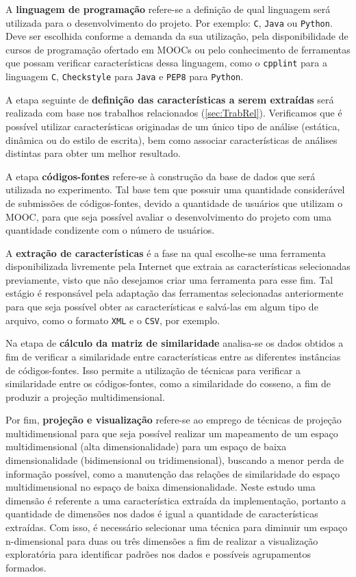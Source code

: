 	 	A \textbf{linguagem de programação} refere-se a definição de qual linguagem será
	 	utilizada para o desenvolvimento do projeto. Por exemplo: \texttt{C}, \texttt{Java}
	 	ou \texttt{Python}. Deve ser escolhida conforme a demanda da sua utilização, pela
	 	disponibilidade de cursos de programação ofertado em \acs{MOOC}s ou pelo conhecimento
	 	de ferramentas que possam verificar características dessa linguagem, como o
	 	\texttt{cpplint} para a linguagem \texttt{C}, \texttt{Checkstyle} para
	 	\texttt{Java} e \texttt{PEP8} para \texttt{Python}.
	 	
	 	A etapa seguinte de \textbf{definição das características a serem extraídas} será
	 	realizada com base nos trabalhos relacionados (\cref{sec:TrabRel}). Verificamos
	 	que é possível utilizar características originadas de um único tipo de análise
	 	(estática, dinâmica ou do estilo de escrita), bem como associar características
	 	de análises distintas para obter um melhor resultado.
	 	
	 	A etapa \textbf{códigos-fontes} refere-se à construção da base de dados que será
	 	utilizada no experimento. Tal base tem que possuir uma quantidade considerável de
	 	submissões de códigos-fontes, devido a quantidade de usuários que utilizam o \acs{MOOC},
	 	para que seja possível avaliar o desenvolvimento do projeto com uma quantidade
	 	condizente com o número de usuários.
	 	
	 	A \textbf{extração de características} é a fase na qual escolhe-se uma ferramenta
	 	disponibilizada livremente pela Internet que extraia as características selecionadas
	 	previamente, visto que não desejamos criar uma ferramenta para esse fim. Tal estágio
	 	é responsável pela adaptação das ferramentas selecionadas anteriormente para que seja
	 	possível obter as características e salvá-las em algum tipo de arquivo, como o
	 	formato \texttt{XML} e o \texttt{CSV}, por exemplo.
	 	
	 	Na etapa de \textbf{cálculo da matriz de similaridade} analisa-se os dados obtidos a
	 	fim de verificar a similaridade entre características entre as diferentes instâncias
	 	de códigos-fontes. Isso permite a utilização de técnicas para verificar a similaridade
	 	entre os códigos-fontes, como a similaridade do cosseno, a fim de produzir a projeção
	 	multidimensional.
	 	
	 	Por fim, \textbf{projeção e visualização} refere-se ao emprego de técnicas de
	 	projeção multidimensional para que seja possível realizar um mapeamento de um
	 	espaço multidimensional (alta dimensionalidade) para um espaço de baixa
	 	dimensionalidade (bidimensional ou tridimensional), buscando a menor perda de
	 	informação possível, como a manutenção das relações de similaridade do espaço
	 	multidimensional no espaço de baixa dimensionalidade. Neste estudo uma dimensão
	 	é referente a uma característica extraída da implementação, portanto a quantidade
	 	de dimensões nos dados é igual a quantidade de características extraídas. Com isso,
	 	é necessário selecionar uma técnica para diminuir um espaço n-dimensional para
	 	duas ou três dimensões a fim de realizar a visualização exploratória para
	 	identificar padrões nos dados e possíveis agrupamentos formados.
	 	
